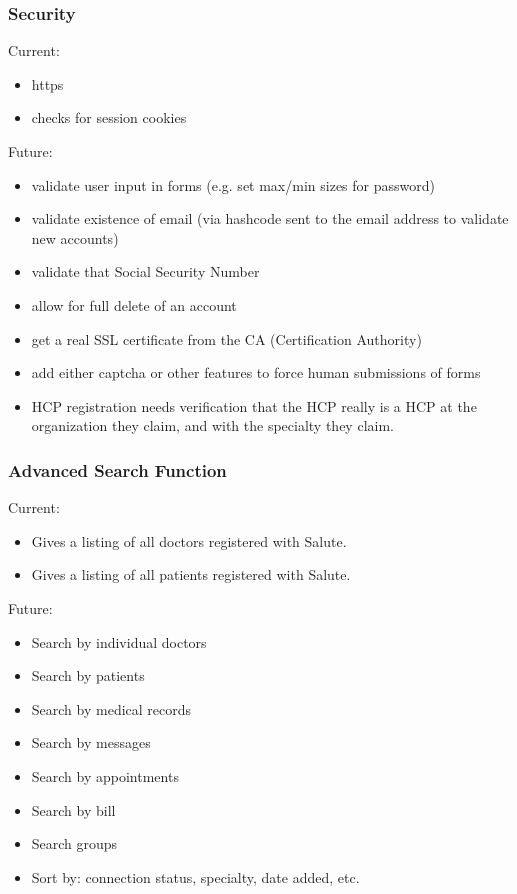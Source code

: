 \subsubsection{Security}
Current:
\begin{itemize}
\item https
\item checks for session cookies
\end{itemize}
Future: 
\begin{itemize}
\item validate user input in forms (e.g. set max/min sizes for password)
\item validate existence of email (via hashcode sent to the email address to validate new accounts)
\item validate that Social Security Number
\item allow for full delete of an account
\item get a real SSL certificate from the CA (Certification Authority)
\item add either captcha or other features to force human submissions of forms
\item HCP registration needs verification that the HCP really is a HCP at the organization they claim, and with the specialty they claim. 
\end{itemize}

\subsubsection{Advanced Search Function}
Current:
\begin{itemize}
\item Gives a listing of all doctors registered with Salute.
\item Gives a listing of all patients registered with Salute.
\end{itemize}
Future: 
\begin{itemize}
\item Search by individual doctors 
\item Search by patients
\item Search by medical records 
\item Search by messages
\item Search by appointments
\item Search by bill
\item Search groups
\item Sort by: connection status, specialty, date added, etc.
\end{itemize}

